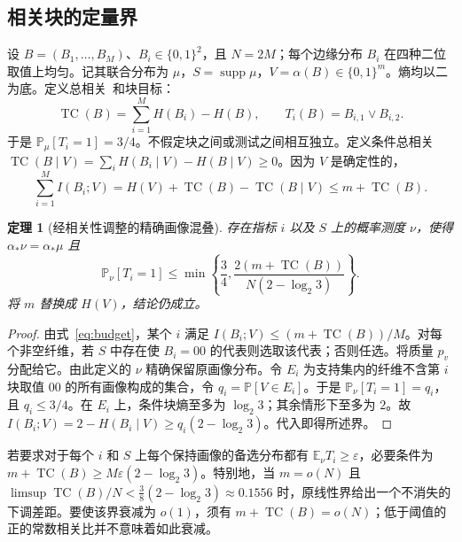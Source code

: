 \documentclass[11pt,a4paper]{article}
\newcommand{\TC}{\operatorname{TC}}
\newcommand{\supp}{\operatorname{supp}}
\newcommand{\bits}{\{0,1\}}
\newcommand{\Prb}{\mathbb P}
\newcommand{\gap}{2-\log_2 3}
\newtheorem{theorem}{定理}[section]
\begin{document}
\subsection{相关块的定量界}
设 $B=(B_1,\ldots,B_M)$、$B_i\in\bits^2$，且 $N=2M$；每个边缘分布 $B_i$ 在四种二位取值上均匀。记其联合分布为 $\mu$，$S=\supp\mu$，$V=\alpha(B)\in\bits^m$。熵均以二为底。定义总相关~\cite{watanabe,cover}和块目标：
\[
\TC(B)=\sum_{i=1}^M H(B_i)-H(B),\qquad
T_i(B)=B_{i,1}\lor B_{i,2}.
\]
于是 $\Prb_\mu[T_i=1]=3/4$。不假定块之间或测试之间相互独立。定义条件总相关 $\TC(B\mid V)=\sum_iH(B_i\mid V)-H(B\mid V)\ge0$。因为 $V$ 是确定性的，
\begin{equation}\label{eq:budget}
\sum_{i=1}^M I(B_i;V)=H(V)+\TC(B)-\TC(B\mid V)\le m+\TC(B).
\end{equation}
\begin{theorem}[经相关性调整的精确画像混叠]\label{thm:alias}
存在指标 $i$ 以及 $S$ 上的概率测度 $\nu$，使得 $\alpha_*\nu=\alpha_*\mu$ 且
\begin{equation}\label{eq:linear}
\Prb_\nu[T_i=1]\le\min\left\{\frac34,\frac{2(m+\TC(B))}{N(\gap)}\right\}.
\end{equation}
将 $m$ 替换成 $H(V)$，结论仍成立。
\end{theorem}
\begin{proof}
由式~\eqref{eq:budget}，某个 $i$ 满足 $I(B_i;V)\le (m+\TC(B))/M$。对每个非空纤维，若 $S$ 中存在使 $B_i=00$ 的代表则选取该代表；否则任选。将质量 $p_v$ 分配给它。由此定义的 $\nu$ 精确保留原画像分布。令 $E_i$ 为支持集内的纤维不含第 $i$ 块取值 $00$ 的所有画像构成的集合，令 $q_i=\Prb[V\in E_i]$。于是 $\Prb_\nu[T_i=1]=q_i$，且 $q_i\le3/4$。在 $E_i$ 上，条件块熵至多为 $\log_2 3$；其余情形下至多为 $2$。故 $I(B_i;V)=2-H(B_i\mid V)\ge q_i(2-\log_2 3)$。代入即得所述界。
\end{proof}
若要求对于每个 $i$ 和 $S$ 上每个保持画像的备选分布都有 $\mathbb E_\nu T_i\ge\varepsilon$，必要条件为 $m+\TC(B)\ge M\varepsilon(2-\log_2 3)$。特别地，当 $m=o(N)$ 且 $\limsup\TC(B)/N < \tfrac38(2-\log_2 3)\approx0.1556$ 时，原线性界给出一个不消失的下调差距。要使该界衰减为 $o(1)$，须有 $m+\TC(B)=o(N)$；低于阈值的正的常数相关比并不意味着如此衰减。
\end{document}
